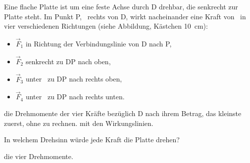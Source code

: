 Eine flache Platte ist um eine feste Achse durch D drehbar, die senkrecht zur Platte steht. Im Punkt P, \rPO\ rechts von D, wirkt nacheinander eine Kraft von \FPO\ in vier verschiedenen Richtungen (siehe Abbildung, Kästchen \SI{10}{\cm}):
\begin{itemize}
 \item $\vec F_1$ in Richtung der Verbindungslinie von D nach P,
 \item $\vec F_2$ senkrecht zu DP nach oben,
 \item $\vec F_3$ unter \alO\ zu DP nach rechts oben,
 \item $\vec F_4$ unter \alO\ zu DP nach rechts unten.
\end{itemize}
\begin{center}
\end{center}

\begin{abcliste}
\abc
{} die Drehmomente der vier Kräfte bezüglich D nach ihrem Betrag, das kleinste zuerst, ohne zu rechnen.  mit den Wirkungslinien.

\abc
In welchem Drehsinn würde jede Kraft die Platte drehen?

\abc
{} die vier Drehmomente.
\end{abcliste}
